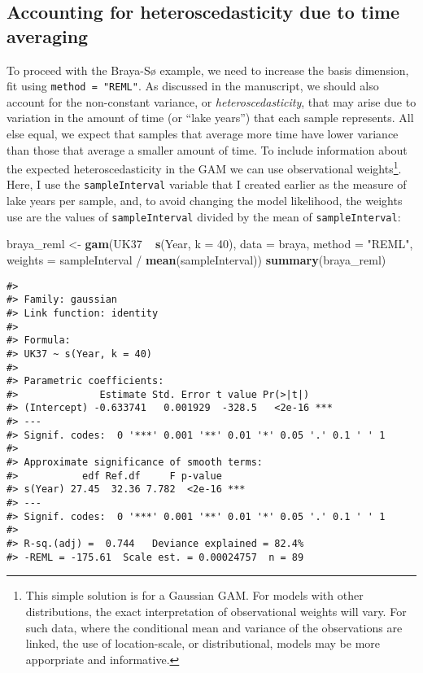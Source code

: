 \documentclass[12pt,]{article}
\newenvironment{Shaded}{\begin{snugshade}}{\end{snugshade}}
\newcommand{\KeywordTok}[1]{\textcolor[rgb]{0.13,0.29,0.53}{\textbf{{#1}}}}
\newcommand{\DataTypeTok}[1]{\textcolor[rgb]{0.13,0.29,0.53}{{#1}}}
\newcommand{\DecValTok}[1]{\textcolor[rgb]{0.00,0.00,0.81}{{#1}}}
\newcommand{\StringTok}[1]{\textcolor[rgb]{0.31,0.60,0.02}{{#1}}}
\newcommand{\NormalTok}[1]{{#1}}
\let\rmarkdownfootnote\footnote%
\def\footnote{\protect\rmarkdownfootnote}
\begin{document}
\subsection{Accounting for heteroscedasticity due to time
averaging}\label{accounting-for-heteroscedasticity-due-to-time-averaging}

To proceed with the Braya-Sø example, we need to increase the basis
dimension, fit using \texttt{method\ =\ "REML"}. As discussed in the
manuscript, we should also account for the non-constant variance, or
\emph{heteroscedasticity}, that may arise due to variation in the amount
of time (or ``lake years'') that each sample represents. All else equal,
we expect that samples that average more time have lower variance than
those that average a smaller amount of time. To include information
about the expected heteroscedasticity in the GAM we can use
observational weights\footnote{This simple solution is for a Gaussian
  GAM. For models with other distributions, the exact interpretation of
  observational weights will vary. For such data, where the conditional
  mean and variance of the observations are linked, the use of
  location-scale, or distributional, models may be more apporpriate and
  informative.}. Here, I use the \texttt{sampleInterval} variable that I
created earlier as the measure of lake years per sample, and, to avoid
changing the model likelihood, the weights use are the values of
\texttt{sampleInterval} divided by the mean of \texttt{sampleInterval}:

\begin{Shaded}
\begin{Highlighting}[]
\NormalTok{braya_reml <-}\StringTok{ }\KeywordTok{gam}\NormalTok{(UK37 ~}\StringTok{ }\KeywordTok{s}\NormalTok{(Year, }\DataTypeTok{k =} \DecValTok{40}\NormalTok{), }\DataTypeTok{data =} \NormalTok{braya,}
                  \DataTypeTok{method =} \StringTok{"REML"}\NormalTok{,}
                  \DataTypeTok{weights =} \NormalTok{sampleInterval /}\StringTok{ }\KeywordTok{mean}\NormalTok{(sampleInterval))}
\KeywordTok{summary}\NormalTok{(braya_reml)}
\end{Highlighting}
\end{Shaded}

\begin{verbatim}
#> 
#> Family: gaussian 
#> Link function: identity 
#> 
#> Formula:
#> UK37 ~ s(Year, k = 40)
#> 
#> Parametric coefficients:
#>              Estimate Std. Error t value Pr(>|t|)    
#> (Intercept) -0.633741   0.001929  -328.5   <2e-16 ***
#> ---
#> Signif. codes:  0 '***' 0.001 '**' 0.01 '*' 0.05 '.' 0.1 ' ' 1
#> 
#> Approximate significance of smooth terms:
#>           edf Ref.df     F p-value    
#> s(Year) 27.45  32.36 7.782  <2e-16 ***
#> ---
#> Signif. codes:  0 '***' 0.001 '**' 0.01 '*' 0.05 '.' 0.1 ' ' 1
#> 
#> R-sq.(adj) =  0.744   Deviance explained = 82.4%
#> -REML = -175.61  Scale est. = 0.00024757  n = 89
\end{verbatim}
\end{document}
